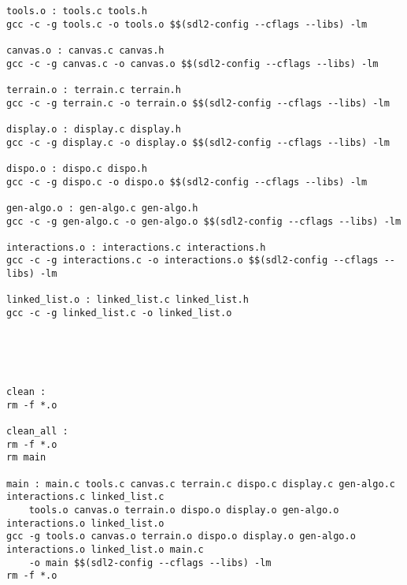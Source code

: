 \begin{verbatim}
tools.o : tools.c tools.h
gcc -c -g tools.c -o tools.o $$(sdl2-config --cflags --libs) -lm

canvas.o : canvas.c canvas.h
gcc -c -g canvas.c -o canvas.o $$(sdl2-config --cflags --libs) -lm

terrain.o : terrain.c terrain.h
gcc -c -g terrain.c -o terrain.o $$(sdl2-config --cflags --libs) -lm

display.o : display.c display.h
gcc -c -g display.c -o display.o $$(sdl2-config --cflags --libs) -lm 

dispo.o : dispo.c dispo.h
gcc -c -g dispo.c -o dispo.o $$(sdl2-config --cflags --libs) -lm 

gen-algo.o : gen-algo.c gen-algo.h
gcc -c -g gen-algo.c -o gen-algo.o $$(sdl2-config --cflags --libs) -lm 

interactions.o : interactions.c interactions.h
gcc -c -g interactions.c -o interactions.o $$(sdl2-config --cflags --libs) -lm 

linked_list.o : linked_list.c linked_list.h
gcc -c -g linked_list.c -o linked_list.o





clean :
rm -f *.o

clean_all :
rm -f *.o
rm main

main : main.c tools.c canvas.c terrain.c dispo.c display.c gen-algo.c interactions.c linked_list.c
	tools.o canvas.o terrain.o dispo.o display.o gen-algo.o interactions.o linked_list.o
gcc -g tools.o canvas.o terrain.o dispo.o display.o gen-algo.o interactions.o linked_list.o main.c
	-o main $$(sdl2-config --cflags --libs) -lm
rm -f *.o
\end{verbatim}
